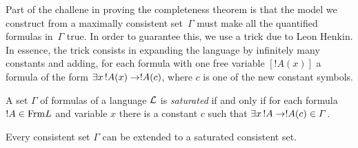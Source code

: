 \documentclass[open-logic-section]{subfiles}
\begin{document}

\begin{wordy}
Part of the challene in proving the completeness theorem is that the
model we construct from a maximally consistent set~$\Gamma$ must make
all the quantified formulas in~$\Gamma$ true.  In order to guarantee
this, we use a trick due to Leon Henkin.  In essence, the trick
consists in expanding the language by infinitely many constants and
adding, for each formula with one free variable $[!A(x)]$ a formula of
the form $\lexists[x][!A(x)] \lif !A(c)$, where $c$ is one of the new
constant symbols.  
\end{wordy}

\begin{defn}
  A set $\Gamma$ of formulas of a language $\mathcal {L}$ is
  \emph{saturated} if and only if for each formula $!A \in
  \Frm {L}$ and variable $x$ there is a constant $c$ such that
  $\lexists[x][!A] \lif !A(c) \in \Gamma$.
\end{defn}


\begin{prop}
  Every consistent set $\Gamma$ can be extended to a saturated
  consistent set.
\end{prop}

\end{document}
